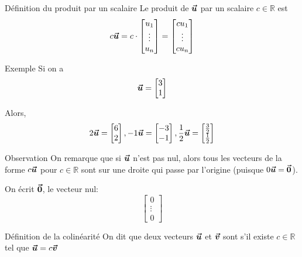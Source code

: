 \documentclass{article}
\begin{document}
\begin{parag}{Définition du produit par un scalaire}
    Le produit de $\bm{\protect\vec{u}}$ par un scalaire $c \in \mathbb{R}$ est
    \[c \bm{\protect\vec{u}} = c\cdot \begin{bmatrix} u_1 \\ \vdots \\ u_n \end{bmatrix} = \begin{bmatrix} cu_1 \\ \vdots \\ cu_n \end{bmatrix}  \]
\end{parag}

\begin{parag}{Exemple}
    Si on a
    \[\bm{\protect\vec{u}} = \begin{bmatrix} 3 \\ 1 \end{bmatrix} \]

    Alors,
    \[2 \bm{\protect\vec{u}} = \begin{bmatrix} 6 \\ 2 \end{bmatrix}, -1 \bm{\protect\vec{u}} = \begin{bmatrix} -3 \\ -1 \end{bmatrix}, \frac{1}{2} \bm{\protect\vec{u}} = \begin{bmatrix} \frac{3}{2} \\ \frac{1}{2} \end{bmatrix} \]

\end{parag}

\begin{parag}{Observation}
    On remarque que si $\bm{\protect\vec{u}}$ n'est pas nul, alors tous les vecteurs de la forme $c \bm{\protect\vec{u}}$ pour $c \in \mathbb{R}$ sont sur une droite qui passe par l'origine (puisque $0 \bm{\protect\vec{u}} = \bm{\protect\vec{0}}$).

    On écrit $\bm{\protect\vec{0}}$, le vecteur nul:
    \[\begin{bmatrix} 0 \\ \vdots \\ 0 \end{bmatrix} \]
\end{parag}

\begin{parag}{Définition de la colinéarité}
    On dit que deux vecteurs $\bm{\protect\vec{u}}$ et $\bm{\protect\vec{v}}$ sont  s'il existe $c \in \mathbb{R}$ tel que $\bm{\protect\vec{u}} = c \bm{\protect\vec{v}}$
\end{parag}
\end{document}
